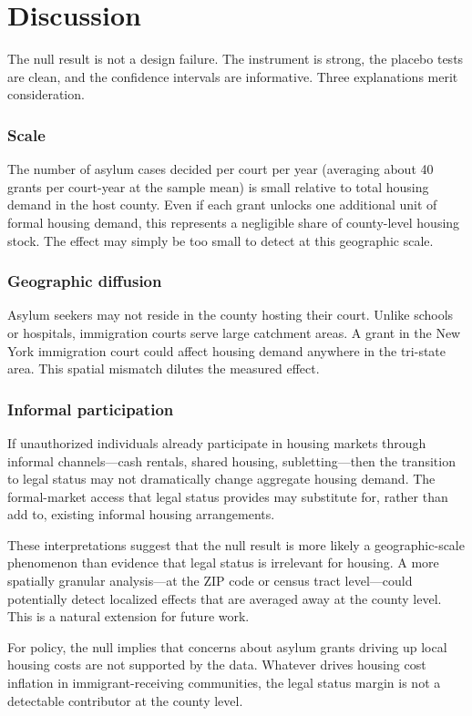 \documentclass[12pt]{article}
\begin{document}
\section{Discussion}

The null result is not a design failure. The instrument is strong, the placebo tests are clean, and the confidence intervals are informative. Three explanations merit consideration.

\subsubsection*{Scale} The number of asylum cases decided per court per year (averaging about 40 grants per court-year at the sample mean) is small relative to total housing demand in the host county. Even if each grant unlocks one additional unit of formal housing demand, this represents a negligible share of county-level housing stock. The effect may simply be too small to detect at this geographic scale.

\subsubsection*{Geographic diffusion} Asylum seekers may not reside in the county hosting their court. Unlike schools or hospitals, immigration courts serve large catchment areas. A grant in the New York immigration court could affect housing demand anywhere in the tri-state area. This spatial mismatch dilutes the measured effect.

\subsubsection*{Informal participation} If unauthorized individuals already participate in housing markets through informal channels---cash rentals, shared housing, subletting---then the transition to legal status may not dramatically change aggregate housing demand. The formal-market access that legal status provides may substitute for, rather than add to, existing informal housing arrangements.

These interpretations suggest that the null result is more likely a geographic-scale phenomenon than evidence that legal status is irrelevant for housing. A more spatially granular analysis---at the ZIP code or census tract level---could potentially detect localized effects that are averaged away at the county level. This is a natural extension for future work.

For policy, the null implies that concerns about asylum grants driving up local housing costs are not supported by the data. Whatever drives housing cost inflation in immigrant-receiving communities, the legal status margin is not a detectable contributor at the county level.
\end{document}
